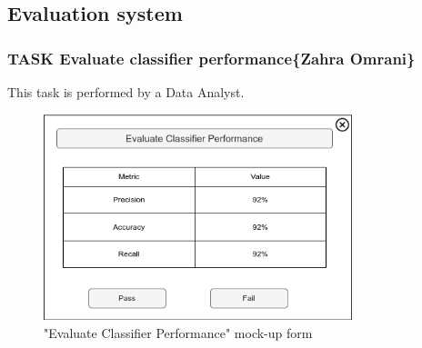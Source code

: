 \subsection{Evaluation system}

\subsubsection{TASK Evaluate classifier performance\{Zahra Omrani\}}
This task is performed by a Data Analyst.

\begin{figure}[H]
\centering
\includegraphics[width=0.8\textwidth]{figures/evaluate_classifier_performance.png}
\caption{"Evaluate Classifier Performance" mock-up form}
\end{figure}

